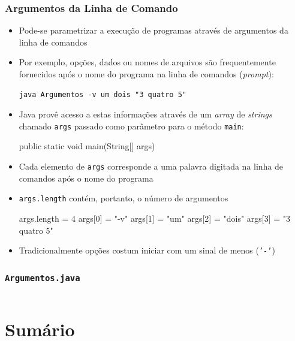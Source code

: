 \documentclass[xcolor={dvipsnames,table},aspectratio=169]{beamer}
\begin{document}
\begin{frame}[fragile]\frametitle{Argumentos da Linha de Comando}
\begin{itemize}
	\item Pode-se parametrizar a execução de programas através de argumentos da linha de comandos
	\item Por exemplo, opções, dados ou nomes de arquivos são frequentemente fornecidos após o nome do programa na linha de comandos (\emph{prompt}):
{\scriptsize
\begin{verbatim}
java Argumentos -v um dois "3 quatro 5"
\end{verbatim}
}
	\item Java provê acesso a estas informações através de um \emph{array} de \emph{strings} chamado \texttt{args} passado como parâmetro para o método \texttt{main}:
{\scriptsize
\begin{javacode}
public static void main(String[] args)
\end{javacode}
}
	\item Cada elemento de \texttt{args} corresponde a uma palavra digitada na linha de comandos após o nome do programa
	\item \texttt{args.length} contém, portanto, o número de argumentos
{\scriptsize
\begin{javacode}
args.length = 4
args[0] = "-v"
args[1] = "um"
args[2] = "dois"
args[3] = "3 quatro 5"
\end{javacode}
}
	\item Tradicionalmente opções costum iniciar com um sinal de menos (\texttt{'-'})
\end{itemize}
\end{frame}

\begin{frame}[fragile]\frametitle{\texttt{Argumentos.java}}
\tiny{\inputminted[bgcolor=cyan!10]{java}{src/Argumentos.java}}
\end{frame}

\section{Sumário}
\end{document}
